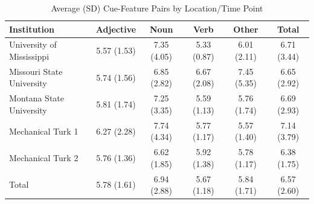 \documentclass[english,,man]{apa6}
\begin{document}
\begin{table}[tbp]
\begin{center}
\begin{threeparttable}
\caption{\label{tab:feature-table}Average (SD) Cue-Feature Pairs by Location/Time Point}
\begin{tabular}{lccccc}
\toprule
Institution & Adjective & Noun & Verb & Other & Total\\
\midrule
University of Mississippi & 5.57 (1.53) & 7.35 (4.05) & 5.33 (0.87) & 6.01 (2.11) & 6.71 (3.44)\\
Missouri State University & 5.74 (1.56) & 6.85 (2.82) & 6.67 (2.08) & 7.45 (5.35) & 6.65 (2.92)\\
Montana State University & 5.81 (1.74) & 7.25 (3.35) & 5.59 (1.13) & 5.76 (1.74) & 6.69 (2.93)\\
Mechanical Turk 1 & 6.27 (2.28) & 7.74 (4.34) & 5.77 (1.17) & 5.57 (1.40) & 7.14 (3.79)\\
Mechanical Turk 2 & 5.76 (1.36) & 6.62 (1.85) & 5.92 (1.38) & 5.78 (1.17) & 6.38 (1.75)\\
Total & 5.78 (1.61) & 6.94 (2.88) & 5.67 (1.18) & 5.84 (1.71) & 6.57 (2.60)\\
\bottomrule
\end{tabular}
\end{threeparttable}
\end{center}
\end{table}
\end{document}
